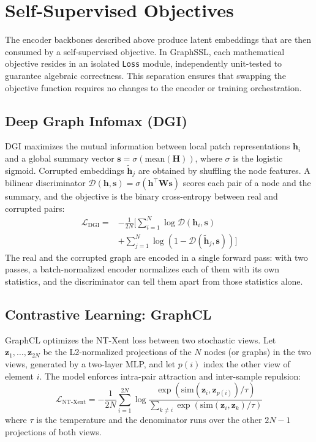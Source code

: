 \documentclass[conference]{IEEEtran}
\begin{document}
\section{Self-Supervised Objectives}
\label{sec:objectives}
The encoder backbones described above produce latent embeddings that are then consumed by a self-supervised objective. In GraphSSL, each mathematical objective resides in an isolated \texttt{Loss} module, independently unit-tested to guarantee algebraic correctness. This separation ensures that swapping the objective function requires no changes to the encoder or training orchestration.

\subsection{Deep Graph Infomax (DGI)}
DGI \cite{dgi} maximizes the mutual information between local patch representations $\bm{h}_i$ and a global summary vector $\bm{s} = \sigma(\text{mean}(\bm{H}))$, where $\sigma$ is the logistic sigmoid. Corrupted embeddings $\tilde{\bm{h}}_j$ are obtained by shuffling the node features. A bilinear discriminator $\mathcal{D}(\bm{h}, \bm{s}) = \sigma(\bm{h}^\top \bm{W} \bm{s})$ scores each pair of a node and the summary, and the objective is the binary cross-entropy between real and corrupted pairs:
\begin{equation}
\begin{split}
\mathcal{L}_{\text{DGI}} = &-\frac{1}{2N} \Bigg[ \sum_{i=1}^{N} \log \mathcal{D}(\bm{h}_i, \bm{s}) \\
&+ \sum_{j=1}^{N} \log (1 - \mathcal{D}(\tilde{\bm{h}}_j, \bm{s})) \Bigg]
\end{split}
\end{equation}
The real and the corrupted graph are encoded in a single forward pass: with two passes, a batch-normalized encoder normalizes each of them with its own statistics, and the discriminator can tell them apart from those statistics alone.

\subsection{Contrastive Learning: GraphCL}
GraphCL \cite{graphcl} optimizes the NT-Xent loss between two stochastic views. Let $\bm{z}_1, \dots, \bm{z}_{2N}$ be the L2-normalized projections of the $N$ nodes (or graphs) in the two views, generated by a two-layer MLP, and let $p(i)$ index the other view of element $i$. The model enforces intra-pair attraction and inter-sample repulsion:
\begin{equation}
\mathcal{L}_{\text{NT-Xent}} = -\frac{1}{2N} \sum_{i=1}^{2N} \log \frac{\exp(\text{sim}(\bm{z}_i, \bm{z}_{p(i)})/\tau)}{\sum_{k \neq i} \exp(\text{sim}(\bm{z}_i, \bm{z}_k)/\tau)}
\end{equation}
where $\tau$ is the temperature and the denominator runs over the other $2N-1$ projections of both views.
\end{document}
